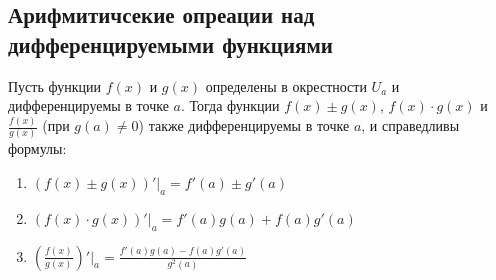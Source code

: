 \subsection{Арифмитичсекие опреации над дифференцируемыми функциями}

\begin{tcolorbox}[title=Теорема 1]
    Пусть функции $f(x)$ и $g(x)$ определены в окрестности $U_a$ и дифференцируемы в точке $a$. Тогда функции $f(x) \pm g(x)$, $f(x) \cdot g(x)$ и $\frac{f(x)}{g(x)}$ (при $g(a) \neq 0$) также дифференцируемы в точке $a$, и справедливы формулы:
    
    \begin{enumerate}
        \item[(а)] $(f(x) \pm g(x))'|_a = f'(a) \pm g'(a)$
        \item[(б)] $(f(x) \cdot g(x))'|_a = f'(a)g(a) + f(a)g'(a)$
        \item[(в)] $\left( \frac{f(x)}{g(x)} \right)' \bigg|_a = \frac{f'(a)g(a) - f(a)g'(a)}{g^2(a)}$
    \end{enumerate}
\end{tcolorbox}

